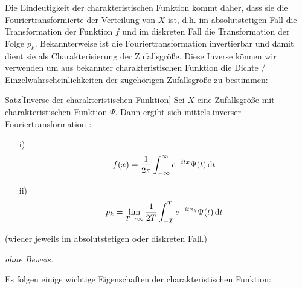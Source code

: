 Die Eindeutigkeit der charakteristischen Funktion kommt daher, dass sie die Fouriertransformierte der Verteilung 
von $X$ ist, d.h. im absolutstetigen Fall die Transformation der Funktion $f$ und im diskreten Fall die Transformation
der Folge $p_k$. Bekannterweise ist die Fouriertransformation invertierbar und damit dient sie als Charakterisierung 
der Zufallsgröße. Diese Inverse können wir verwenden um aus bekannter charakteristischen Funktion die Dichte / 
Einzelwahrscheinlichkeiten der zugehörigen Zufallsgröße zu bestimmen:

\begin{colbox}{Satz}[Inverse der charakteristischen Funktion]
    Sei $X$ eine Zufallsgröße mit charakteristischen Funktion $\Psi$. Dann ergibt sich mittels inverser 
    Fouriertransformation :
    \begin{enumerate}
        \item[i)] 
        \[
            f(x) = \dfrac{1}{2\pi}\int_{-\infty}^{\infty}e^{-itx}\Psi(t)\mathop{}\!\mathrm{d} t
        \]
        \item[ii)] 
        \[
            p_k = \lim_{T\to\infty} \dfrac{1}{2T}\int_{-T}^{T}e^{-itx_k}\Psi(t)\mathop{}\!\mathrm{d} t
        \]
    \end{enumerate}
    (wieder jeweils im absolutstetigen oder diskreten Fall.)
\end{colbox}
\textit{ohne Beweis.}

Es folgen einige wichtige Eigenschaften der charakteristischen Funktion:

